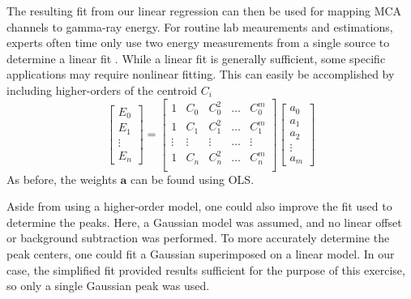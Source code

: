 The resulting fit from our linear regression can then be used for mapping
MCA channels to gamma-ray energy. For routine lab meaurements and estimations, experts often time only use two energy measurements from a single source to determine a linear fit \cite{gilmore_2011}.
While a linear fit is generally sufficient, some specific applications may require nonlinear fitting.
This can easily be accomplished by including higher-orders of the centroid $C_i$
\begin{equation}
    \begin{bmatrix}
        E_0 \\ E_1 \\ \vdots \\ E_n
    \end{bmatrix} =
    \begin{bmatrix}
        1 & C_0  & C_0^2 & \dots &  C_0^m\\
        1 & C_1  & C_1^2 & \dots &  C_1^m\\
        \vdots & \vdots  & \vdots & \dots & \vdots \\
        1 & C_n  & C_n^2 & \dots &  C_n^m\\
    \end{bmatrix}
    \begin{bmatrix}
        a_0 \\ a_1 \\ a_2 \\ \vdots \\ a_m
    \end{bmatrix}
\end{equation}
As before, the weights $\mathbf{a}$ can be found using OLS.

Aside from using a higher-order model, one could also improve the fit used to
determine the peaks. Here, a Gaussian model was assumed, and no linear offset
or background subtraction was performed. To more accurately determine the peak centers,
one could fit a Gaussian superimposed on a linear model. In our case, the
simplified fit provided results sufficient for the purpose of this exercise,
so only a single Gaussian peak was used.
